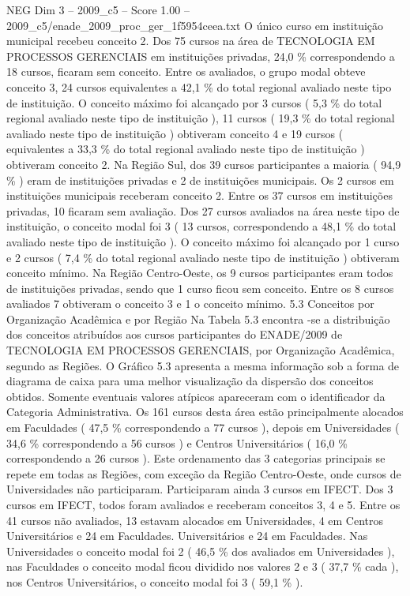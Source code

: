 \begin{textsample}{NEG Dim 3 – 2009\_c5 – Score 1.00 – 2009\_c5/enade\_2009\_proc\_ger\_1f5954ceea.txt}
O único curso em instituição municipal recebeu conceito 2.
Dos 75 cursos na área de TECNOLOGIA EM PROCESSOS GERENCIAIS em instituições privadas, 24,0 \% correspondendo a 18 cursos, ficaram sem conceito.
Entre os avaliados, o grupo modal obteve conceito 3, 24 cursos equivalentes a 42,1 \% do total regional avaliado neste tipo de instituição.
O conceito máximo foi alcançado por 3 cursos ( 5,3 \% do total regional avaliado neste tipo de instituição ), 11 cursos ( 19,3 \% do total regional avaliado neste tipo de instituição ) obtiveram conceito 4 e 19 cursos ( equivalentes a 33,3 \% do total regional avaliado neste tipo de instituição ) obtiveram conceito 2.
Na Região Sul, dos 39 cursos participantes a maioria ( 94,9 \% ) eram de instituições privadas e 2 de instituições municipais.
Os 2 cursos em instituições municipais receberam conceito 2.
Entre os 37 cursos em instituições privadas, 10 ficaram sem avaliação.
Dos 27 cursos avaliados na área neste tipo de instituição, o conceito modal foi 3 ( 13 cursos, correspondendo a 48,1 \% do total avaliado neste tipo de instituição ).
O conceito máximo foi alcançado por 1 curso e 2 cursos ( 7,4 \% do total regional avaliado neste tipo de instituição ) obtiveram conceito mínimo.
Na Região Centro-Oeste, os 9 cursos participantes eram todos de instituições privadas, sendo que 1 curso ficou sem conceito.
Entre os 8 cursos avaliados 7 obtiveram o conceito 3 e 1 o conceito mínimo. 5.3 Conceitos por Organização Acadêmica e por Região Na Tabela 5.3 encontra -se a distribuição dos conceitos atribuídos aos cursos participantes do ENADE/2009 de TECNOLOGIA EM PROCESSOS GERENCIAIS, por Organização Acadêmica, segundo as Regiões.
O Gráfico 5.3 apresenta a mesma informação sob a forma de diagrama de caixa para uma melhor visualização da dispersão dos conceitos obtidos.
Somente eventuais valores atípicos apareceram com o identificador da Categoria Administrativa.
Os 161 cursos desta área estão principalmente alocados em Faculdades ( 47,5 \% correspondendo a 77 cursos ), depois em Universidades ( 34,6 \% correspondendo a 56 cursos ) e Centros Universitários ( 16,0 \% correspondendo a 26 cursos ).
Este ordenamento das 3 categorias principais se repete em todas as Regiões, com exceção da Região Centro-Oeste, onde cursos de Universidades não participaram.
Participaram ainda 3 cursos em IFECT.
Dos 3 cursos em IFECT, todos foram avaliados e receberam conceitos 3, 4 e 5.
Entre os 41 cursos não avaliados, 13 estavam alocados em Universidades, 4 em Centros Universitários e 24 em Faculdades.
Universitários e 24 em Faculdades.
Nas Universidades o conceito modal foi 2 ( 46,5 \% dos avaliados em Universidades ), nas Faculdades o conceito modal ficou dividido nos valores 2 e 3 ( 37,7 \% cada ), nos Centros Universitários, o conceito modal foi 3 ( 59,1 \% ).

\end{textsample}
